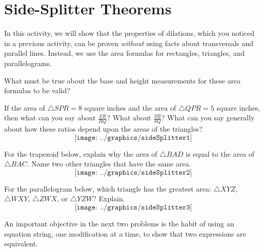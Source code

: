 \newpage

\section{Side-Splitter Theorems}
In this activity, we will show that the properties of dilations, which you noticed in a previous activity, can be proven \emph{without} using facts about transversals and parallel lines.  Instead, we use the area formulas for rectangles, triangles, and parallelograms.  
\begin{question}
What must be true about the base and height measurements for these area formulas to be valid? 
\end{question}

\begin{prob}
If the area of $\triangle SPR = 8$ square inches and the area of $\triangle QPR = 5$ square inches, then what can you say about $\frac{SR}{RQ}$?  What about $\frac{SR}{SQ}$?  What can you say generally about how these ratios depend upon the areas of the triangles?  
$$\texttt{[image: ../graphics/sideSplitter1]}$$
\end{prob}

\begin{prob}
For the trapezoid below, explain why the area of $\triangle BAD$ is equal to the area of $\triangle BAC$.  Name two other triangles that have the same area.
$$\texttt{[image: ../graphics/sideSplitter2]}$$
\end{prob}

\begin{prob}
For the parallelogram below, which triangle has the greatest area: $\triangle XYZ$, $\triangle WXY$, $\triangle ZWX$, or $\triangle YZW$?  Explain.  
$$\texttt{[image: ../graphics/sideSplitter3]}$$
\end{prob}

\begin{teachingnote}
An important objective in the next two problems is the habit of using an equation string, one modification at a time, to show that two expressions are equivalent.
\end{teachingnote}

